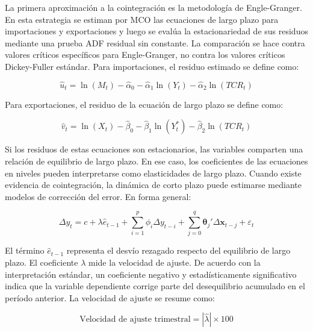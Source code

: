 \documentclass[11pt,a4paper]{article}
\begin{document}
	La primera aproximación a la cointegración es la metodología de Engle-Granger.
	En esta estrategia se estiman por MCO las ecuaciones de largo plazo para
	importaciones y exportaciones y luego se evalúa la estacionariedad de sus
	residuos mediante una prueba ADF residual sin constante. La comparación se hace
	contra valores críticos específicos para Engle-Granger, no contra los valores
	críticos Dickey-Fuller estándar. Para importaciones, el residuo estimado se
	define como:

	\begin{equation}
		\widehat{u}_t
		= \ln(M_t) - \widehat{\alpha}_0
		- \widehat{\alpha}_1 \ln(Y_t)
		- \widehat{\alpha}_2 \ln(TCR_t)
		\label{eq:tp3-residuo-eg-importaciones}
	\end{equation}

	Para exportaciones, el residuo de la ecuación de largo plazo se define como:

	\begin{equation}
		\widehat{v}_t
		= \ln(X_t) - \widehat{\beta}_0
		- \widehat{\beta}_1 \ln(Y_t^*)
		- \widehat{\beta}_2 \ln(TCR_t)
		\label{eq:tp3-residuo-eg-exportaciones}
	\end{equation}

	Si los residuos de estas ecuaciones son estacionarios, las variables comparten
	una relación de equilibrio de largo plazo. En ese caso, los coeficientes de las
	ecuaciones en niveles pueden interpretarse como elasticidades de largo plazo.
	Cuando existe evidencia de cointegración, la dinámica de corto plazo puede
	estimarse mediante modelos de corrección del error. En forma general:

	\begin{equation}
		\Delta y_t
		= c + \lambda \widehat{e}_{t-1}
		+ \sum_{i=1}^{p}\phi_i \Delta y_{t-i}
		+ \sum_{j=0}^{q}\boldsymbol{\theta}_j'\Delta \mathbf{x}_{t-j}
		+ \varepsilon_t
		\label{eq:tp3-ecm-general}
	\end{equation}

	El término \(\widehat{e}_{t-1}\) representa el desvío rezagado respecto del
	equilibrio de largo plazo. El coeficiente \(\lambda\) mide la velocidad de
	ajuste. De acuerdo con la interpretación estándar, un coeficiente negativo y
	estadísticamente significativo indica que la variable dependiente corrige parte
	del desequilibrio acumulado en el período anterior. La velocidad de ajuste se
	resume como:

	\begin{equation}
		\text{Velocidad de ajuste trimestral}
		= |\widehat{\lambda}| \times 100
		\label{eq:tp3-velocidad-ajuste}
	\end{equation}
\end{document}
